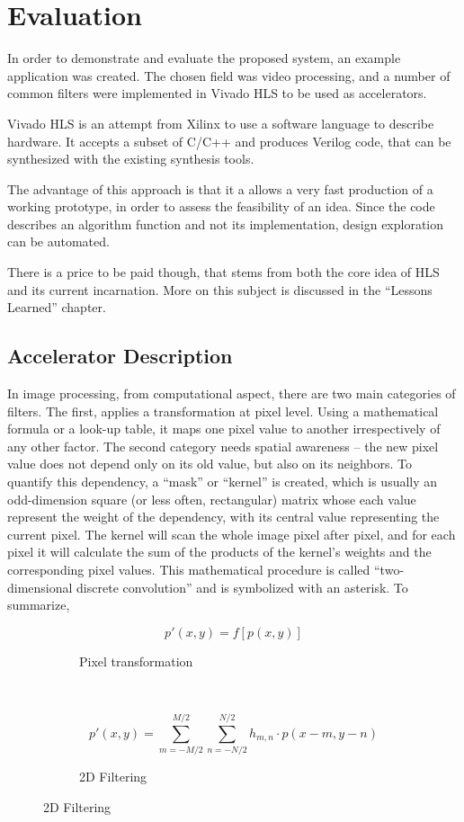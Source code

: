 \chapter{Evaluation}

In order to demonstrate and evaluate the proposed system, an example application was created.
The chosen field was video processing, and a number of common filters were implemented
in Vivado HLS to be used as accelerators.

Vivado HLS is an attempt from Xilinx to use a software language to describe hardware.
It accepts a subset of C/C++ and produces Verilog code, that can be synthesized with
the existing synthesis tools.

The advantage of this approach is that it a allows a very fast production of a working
prototype, in order to assess the feasibility of an idea. Since the code describes
an algorithm function and not its implementation, design exploration can be automated.

There is a price to be paid though, that stems from both the core idea of HLS and its
current incarnation. More on this subject is discussed in the ``Lessons Learned'' chapter.

\section{Accelerator Description}

In image processing, from computational aspect, there are two main categories of filters.
The first, applies a transformation at pixel level. Using a mathematical formula or a
look-up table, it maps one pixel value to another irrespectively of any other factor.
The second category needs spatial awareness -- the new pixel value does not depend only
on its old value, but also on its neighbors. To quantify this dependency, a ``mask'' or
``kernel'' is created, which is usually an odd-dimension square (or less often, rectangular)
matrix whose each value represent the weight of the dependency, with its central value
representing the current pixel. The kernel will scan the whole image pixel after pixel,
and for each pixel it will calculate the sum of the products of the kernel's weights
and the corresponding pixel values. This mathematical procedure is called
``two-dimensional discrete convolution'' and is symbolized with an asterisk.
To summarize,

\begin{figure}[H]
\centering
\begin{subfigure}[b]{.3\linewidth}
	\[
		p'(x,y) = f\left[p(x,y) \right]
	\]
	\caption{Pixel transformation}
\end{subfigure}
~\quad
\begin{subfigure}[b]{.6\linewidth}
	\[
		p'(x,y) = \sum_{m = -M/2}^{M/2}{
			\sum_{n = -N/2}^{N/2}{
				{h_{m,n}\cdot p(x - m, y - n)}
			}
		}
	\]
	\caption{2D Filtering}
\end{subfigure}
\end{figure}

